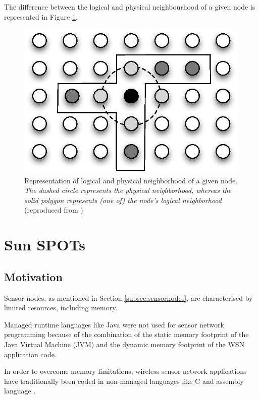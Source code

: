 The difference between the logical and physical neighbourhood of a given node 
is represented in Figure \ref{Fig:LN_physical_vs_logical}.

\begin{figure} 
\centering
\label{Fig:LN_physical_vs_logical}
\includegraphics[scale=0.65]{img/LN_physical_vs_logical.eps} 
\caption[Difference between physical and logical neighborhoods]{Representation 
of logical and physical neighborhood of a given node. \emph{The dashed circle 
represents the physical neighborhood, whereas the solid polygon represents (one 
of) the node's logical neighborhood} (reproduced from
\cite{mottola_LN:2006})}
\end{figure} 

\section {Sun SPOTs}	

\subsection{Motivation}

Sensor nodes, as mentioned in Section \ref{subsec:sensornodes}, are
characterised by limited resources, including memory.
 
Managed runtime languages like Java were not used for sensor network programming
because of the combination of the static memory footprint of the Java Virtual
Machine (JVM) and the dynamic memory footprint of the WSN application code.

In order to overcome
memory limitations, wireless sensor network applications have traditionally been
 coded in non-managed languages like C and assembly language
 \cite{simon_squawk:2006}. 
 
